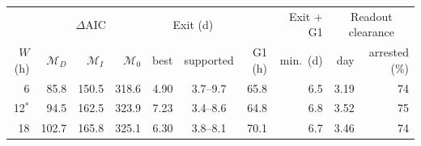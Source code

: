 \setlength{\tabcolsep}{4pt}
\begin{tabular}{@{}rrrrrcrrrr@{}}
\toprule
 & \multicolumn{3}{c}{$\Delta\mathrm{AIC}$} & \multicolumn{2}{c}{Exit (d)} & & Exit + G1 & \multicolumn{2}{c}{Readout clearance} \\
\cmidrule(lr){2-4}\cmidrule(lr){5-6}\cmidrule(lr){9-10}
$W$ (h) & $\mathcal{M}_D$ & $\mathcal{M}_I$ & $\mathcal{M}_0$ & best & supported & G1 (h) & min.\ (d) & day & arrested (\%) \\
\midrule
6 & 85.8 & 150.5 & 318.6 & 4.90 & 3.7--9.7 & 65.8 & 6.5 & 3.19 & 74 \\
12$^{*}$ & 94.5 & 162.5 & 323.9 & 7.23 & 3.4--8.6 & 64.8 & 6.8 & 3.52 & 75 \\
18 & 102.7 & 165.8 & 325.1 & 6.30 & 3.8--8.1 & 70.1 & 6.7 & 3.46 & 74 \\
\bottomrule
\end{tabular}